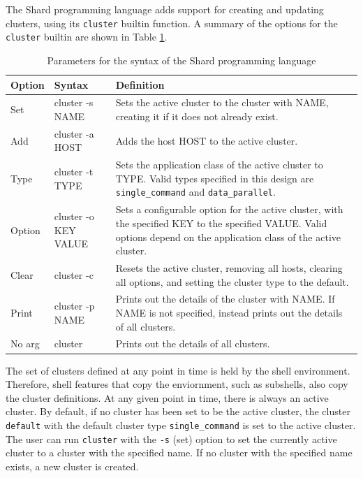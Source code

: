 \documentclass[twoside]{report}
\begin{document}
The Shard programming language adds support for creating and updating clusters, using its \texttt{cluster} builtin function.
A summary of the options for the \texttt{cluster} builtin are shown in Table \ref{fig:pl_cluster_options}.

\begin{table}
  \begin{center}
    \begin{tabularx}{\textwidth}{|l|l|X|}
      \hline
      Option & Syntax               & Definition                                                                                                                                                             \\ \hline
      Set    & cluster -s NAME      & Sets the active cluster to the cluster with NAME, creating it if it does not already exist.
      \\ \hline
      Add    & cluster -a HOST      & Adds the host HOST to the active cluster.
      \\ \hline
      Type   & cluster -t TYPE      & Sets the application class of the active cluster to TYPE. Valid types specified in this design are \texttt{single\_command} and \texttt{data\_parallel}.
      \\ \hline
      Option & cluster -o KEY VALUE & Sets a configurable option for the active cluster, with the specified KEY to the specified VALUE. Valid options depend on the application class of the active cluster.
      \\ \hline
      Clear  & cluster -c           & Resets the active cluster, removing all hosts, clearing all options, and setting the cluster type to the default.
      \\ \hline
      Print  & cluster -p NAME      & Prints out the details of the cluster with NAME. If NAME is not specified, instead prints out the details of all clusters.
      \\ \hline
      No arg & cluster              & Prints out the details of all clusters.
      \\ \hline
    \end{tabularx}
    \caption{Parameters for the syntax of the Shard programming language}
    \label{fig:pl_cluster_options}
  \end{center}
\end{table}

The set of clusters defined at any point in time is held by the shell environment.
Therefore, shell features that copy the enviornment, such as subshells, also copy the cluster definitions.
At any given point in time, there is always an active cluster.
By default, if no cluster has been set to be the active cluster, the cluster \texttt{default} with the default cluster type \texttt{single\_command} is set to the active cluster.
The user can run \texttt{cluster} with the \texttt{-s} (set) option to set the currently active cluster to a cluster with the specified name.
If no cluster with the specified name exists, a new cluster is created.
\end{document}
